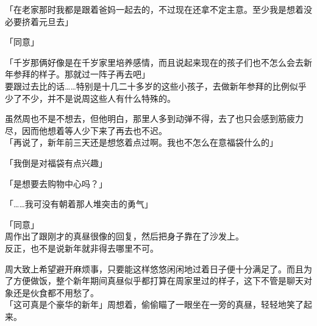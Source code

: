 「在老家那时我都是跟着爸妈一起去的，不过现在还拿不定主意。至少我是想着没必要挤着元旦去」

「同意」

「千岁那俩好像是在千岁家里培养感情，而且说起来现在的孩子们也不怎么会去新年参拜的样子。那就过一阵子再去吧」\\

要跟过去比的话……特别是十几二十多岁的这些小孩子，去做新年参拜的比例似乎少了不少，并不是说周这些人有什么特殊的。

虽然周也不是不想去，但他明白，那里人多到动弹不得，去了也只会感到筋疲力尽，因而他想着等人少下来了再去也不迟。\\

「再说了，新年前三天还是想悠着点过啊。我也不怎么在意福袋什么的」

「我倒是对福袋有点兴趣」

「是想要去购物中心吗？」

「……我可没有朝着那人堆突击的勇气」

「同意」\\

周作出了跟刚才的真昼很像的回复，然后把身子靠在了沙发上。\\

反正，也不是说新年就非得去哪里不可。

周大致上希望避开麻烦事，只要能这样悠悠闲闲地过着日子便十分满足了。而且为了方便做饭，整个新年期间真昼似乎都打算在周家里过的样子，这下不管是聊天对象还是伙食都不用愁了。\\

「这可真是个豪华的新年」周想着，偷偷瞄了一眼坐在一旁的真昼，轻轻地笑了起来。
